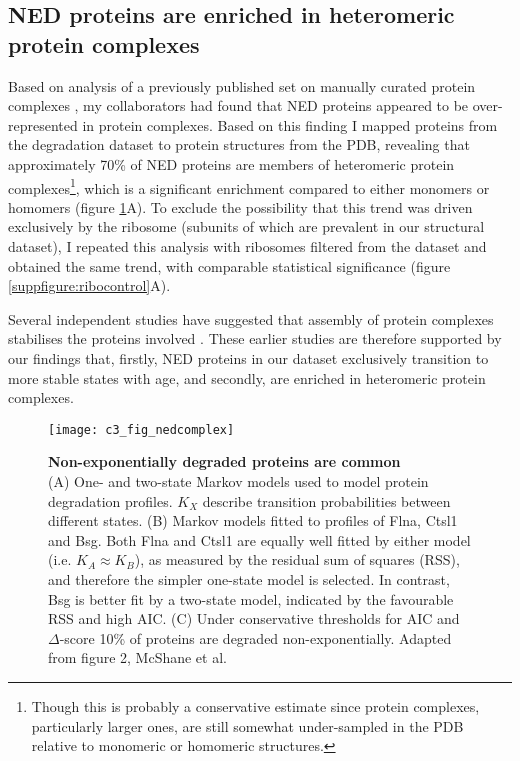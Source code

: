 \documentclass[a4paper,11pt,twoside,openright]{scrbook}
\begin{document}
\subsection{NED proteins are enriched in heteromeric protein complexes}

Based on analysis of a previously published set on manually curated protein complexes \cite{Ori2016}, my collaborators had found that NED proteins appeared to be over-represented in protein complexes. Based on this finding I mapped proteins from the degradation dataset to protein structures from the PDB, revealing that approximately 70\% of NED proteins are members of heteromeric protein complexes\footnote{Though this is probably a conservative estimate since protein complexes, particularly larger ones, are still somewhat under-sampled in the PDB relative to monomeric or homomeric structures.}, which is a significant enrichment compared to either monomers or homomers (figure \ref{figure:nedcomplex}A). To exclude the possibility that this trend was driven exclusively by the ribosome (subunits of which are prevalent in our structural dataset), I repeated this analysis with ribosomes filtered from the dataset and obtained the same trend, with comparable statistical significance (figure \ref{suppfigure:ribocontrol}A).

Several independent studies have suggested that assembly of protein complexes stabilises the proteins involved \cite{Goldberg2003,Malinverni2006,Toyama2013}. These earlier studies are therefore supported by our findings that, firstly, NED proteins in our dataset exclusively transition to more stable states with age, and secondly, are enriched in heteromeric protein complexes.


\begin{figure}
    \texttt{[image: c3\_fig\_nedcomplex]}
    \caption[Non-exponentially degraded proteins are common]{\sffamily \textbf{Non-exponentially degraded proteins are common} \\ \small (A) One- and two-state Markov models used to model protein degradation profiles. $K_{X}$ describe transition probabilities between different states. (B) Markov models fitted to profiles of Flna, Ctsl1 and Bsg. Both Flna and Ctsl1 are equally well fitted by either model (i.e. $K_{A} \approx K_{B}$), as measured by the residual sum of squares (RSS), and therefore the simpler one-state model is selected. In contrast, Bsg is better fit by a two-state model, indicated by the favourable RSS and high AIC. (C) Under conservative thresholds for AIC and $\Delta$-score 10\% of proteins are degraded non-exponentially. Adapted from figure 2, McShane et al.\cite{McShane2016}}
    \label{figure:nedcomplex}
\end{figure}
\end{document}
